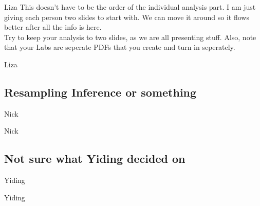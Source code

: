 \documentclass{beamer}\usepackage[]{graphicx}\usepackage[]{color}
\begin{document}
\begin{frame}{Liza}
This doesn't have to be the order of the individual analysis part. I am just giving each person two slides to start with. We can move it around so it flows better after all the info is here. \\

Try to keep your analysis to two slides, as we are all presenting stuff. Also, note that your Labs are seperate PDFs that you create and turn in seperately.

\end{frame}


\begin{frame}{Liza}

\end{frame}


\subsection{Resampling Inference or something}


\begin{frame}{Nick}

\end{frame}

\begin{frame}{Nick}

\end{frame}


\subsection{Not sure what Yiding decided on}


\begin{frame}{Yiding}

\end{frame}


\begin{frame}{Yiding}

\end{frame}
\end{document}
